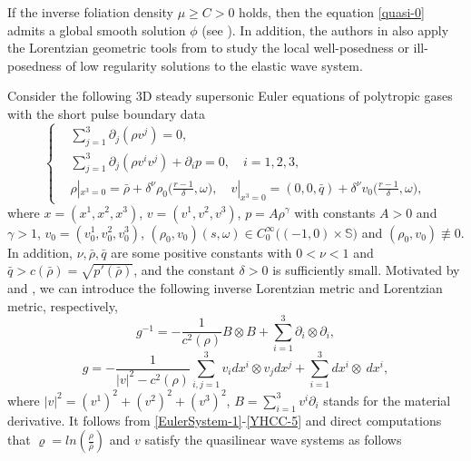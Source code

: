 \documentclass[11pt,twoside]{article}
\def\dl{\delta}
\begin{document}
\begin{remark}\label{Yin.6}
If the inverse foliation density $\mu\ge C>0$ holds, then the equation \eqref{quasi-0}
admits a global smooth solution $\phi$ (see \cite{MPY, Ding2, Ding3, Ding4, Wang}).
In addition, the authors in \cite{An-1, An-2} also apply the Lorentzian geometric tools from \cite{Ch1}
to study the local well-posedness or ill-posedness of low regularity solutions to the elastic wave system.
\end{remark}


\begin{remark}\label{Yin.7}
Consider the following 3D steady supersonic Euler equations of polytropic gases with the
short pulse boundary data
\begin{equation}\label{EulerSystem-1}
\left\{
\begin{aligned}
&\displaystyle\sum_{j = 1}^{3} \partial_{j}(\rho v^{j})=0, \\
&\displaystyle\sum_{j = 1}^{3} \partial_{j}(\rho v^{i} v^{j})+\partial_{i}p=0 ,\quad i = 1, 2, 3,\\
&\rho|_{x^3=0}=\bar\rho+\dl^{\nu}\rho_0\big(\frac{r-1}{\delta}, \omega\big),\quad v|_{x^3=0}=(0,0,\bar q)+\dl^{\nu} v_0\big(\frac{r-1}{\delta}, \omega\big),
\end{aligned}
\right.
\end{equation}
where $x=(x^1, x^2, x^3)$, $v=(v^1,v^2,v^3)$, $p=A\rho^{\gamma}$ with constants $A>0$ and $\gamma>1$,
$v_0=(v^1_0,v^2_0,v^3_0)$, $(\rho_0,v_0)(s,\omega)\in C_0^\infty\big((-1, 0) \times \mathbb{S}\big)$ and
$(\rho_0,v_0)\not\equiv 0$. In addition,  $\nu, \bar\rho, \bar q$ are some positive constants
with $0<\nu<1$ and $\bar q>c(\bar\rho)=\sqrt{p'(\bar\rho)}$,
and the constant $\delta>0$ is sufficiently small. Motivated by \cite{Luk} and \cite{LS2}, we can
introduce the following inverse Lorentzian metric and Lorentzian metric, respectively,
\begin{equation}\label{YHCC-4}
g^{-1} = -\frac{1}{c^2(\rho)}B\otimes B + \sum_{i=1}^3 \partial_i\otimes\partial_i,
\end{equation}
\begin{equation}\label{YHCC-5}
g = -\frac{1}{|v|^2-c^2(\rho)}\sum_{i,j=1}^3v_id x^i\otimes v_jd x^j+\sum_{i=1}^3 dx^i\otimes\ d x^i,
\end{equation}
where $|v|^2=(v^1)^2+(v^2)^2+(v^3)^2$, $B=\sum_{i=1}^3v^i \partial_i$ stands for the material derivative. It follows from
\eqref{EulerSystem-1}-\eqref{YHCC-5}
and direct computations that $\varrho=ln (\frac{\rho}{\bar\rho})$ and $v$ satisfy the quasilinear wave systems as follows

\end{remark}
\end{document}
